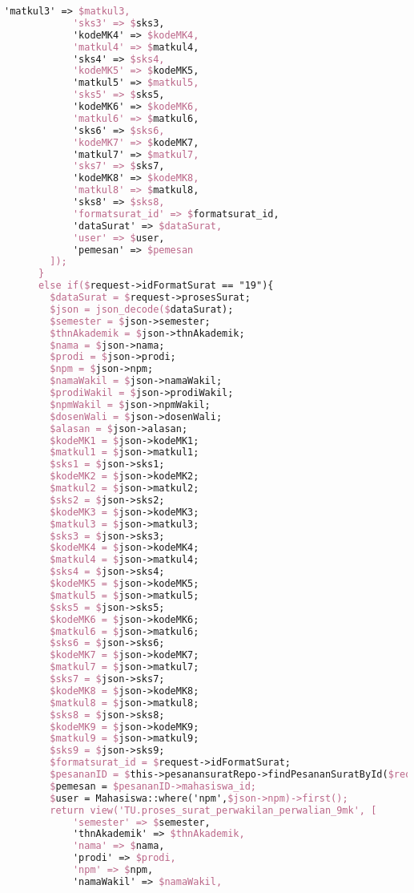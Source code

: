 \begin{lstlisting}[language=tex,basicstyle=\tiny,caption=PesanansuratController.php]
            'matkul3' => $matkul3,
            'sks3' => $sks3,
            'kodeMK4' => $kodeMK4,
            'matkul4' => $matkul4,
            'sks4' => $sks4,
            'kodeMK5' => $kodeMK5,
            'matkul5' => $matkul5,
            'sks5' => $sks5,
            'kodeMK6' => $kodeMK6,
            'matkul6' => $matkul6,
            'sks6' => $sks6,
            'kodeMK7' => $kodeMK7,
            'matkul7' => $matkul7,
            'sks7' => $sks7,
            'kodeMK8' => $kodeMK8,
            'matkul8' => $matkul8,
            'sks8' => $sks8,
            'formatsurat_id' => $formatsurat_id,
            'dataSurat' => $dataSurat,
            'user' => $user,
            'pemesan' => $pemesan
        ]);
      }
      else if($request->idFormatSurat == "19"){
        $dataSurat = $request->prosesSurat;
        $json = json_decode($dataSurat);
        $semester = $json->semester;
        $thnAkademik = $json->thnAkademik;
        $nama = $json->nama;
        $prodi = $json->prodi;
        $npm = $json->npm;
        $namaWakil = $json->namaWakil;
        $prodiWakil = $json->prodiWakil;
        $npmWakil = $json->npmWakil;
        $dosenWali = $json->dosenWali;
        $alasan = $json->alasan;
        $kodeMK1 = $json->kodeMK1;
        $matkul1 = $json->matkul1;
        $sks1 = $json->sks1;
        $kodeMK2 = $json->kodeMK2;
        $matkul2 = $json->matkul2;
        $sks2 = $json->sks2;
        $kodeMK3 = $json->kodeMK3;
        $matkul3 = $json->matkul3;
        $sks3 = $json->sks3;
        $kodeMK4 = $json->kodeMK4;
        $matkul4 = $json->matkul4;
        $sks4 = $json->sks4;
        $kodeMK5 = $json->kodeMK5;
        $matkul5 = $json->matkul5;
        $sks5 = $json->sks5;
        $kodeMK6 = $json->kodeMK6;
        $matkul6 = $json->matkul6;
        $sks6 = $json->sks6;
        $kodeMK7 = $json->kodeMK7;
        $matkul7 = $json->matkul7;
        $sks7 = $json->sks7;
        $kodeMK8 = $json->kodeMK8;
        $matkul8 = $json->matkul8;
        $sks8 = $json->sks8;
        $kodeMK9 = $json->kodeMK9;
        $matkul9 = $json->matkul9;
        $sks9 = $json->sks9;
        $formatsurat_id = $request->idFormatSurat;
        $pesananID = $this->pesanansuratRepo->findPesananSuratById($request->id);
        $pemesan = $pesananID->mahasiswa_id;
        $user = Mahasiswa::where('npm',$json->npm)->first();
        return view('TU.proses_surat_perwakilan_perwalian_9mk', [
            'semester' => $semester,
            'thnAkademik' => $thnAkademik,
            'nama' => $nama,
            'prodi' => $prodi,
            'npm' => $npm,
            'namaWakil' => $namaWakil,

\end{lstlisting}
